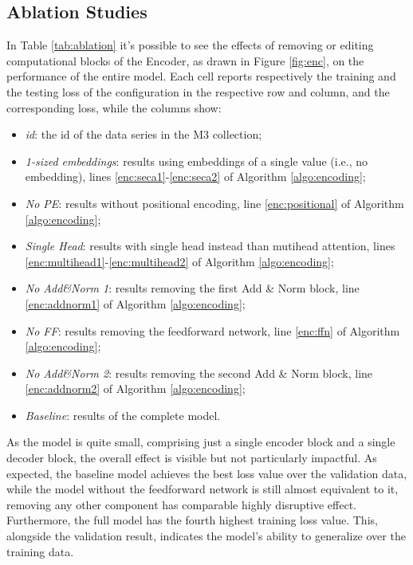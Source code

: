 \documentclass[algorithms,article,submit,pdftex,moreauthors]{Definitions/mdpi}
\begin{document}
{\color{blue}
\subsection{Ablation Studies}

In Table \ref{tab:ablation} it's possible to see the effects of removing or editing computational blocks of the Encoder, as drawn in Figure \ref{fig:enc}, on the performance of the entire model. Each cell reports respectively the training and the testing loss of the configuration in the respective row and column, and the corresponding loss, while the columns show:

\begin{itemize}
	\item {\it id}: the id of the data series in the M3 collection;
	\item {\it 1-sized embeddings}: results using embeddings of a single value (i.e., no embedding), lines \ref{enc:seca1}-\ref{enc:seca2} of Algorithm \ref{algo:encoding};
	\item {\it No PE}: results without positional encoding, line \ref{enc:positional} of Algorithm \ref{algo:encoding};
	\item {\it Single Head}: results with single head instead than mutihead attention, lines \ref{enc:multihead1}-\ref{enc:multihead2} of Algorithm \ref{algo:encoding}; 
	\item {\it No Add\&Norm 1}: results removing the first Add \& Norm block, line \ref{enc:addnorm1} of Algorithm \ref{algo:encoding};
	\item {\it No FF}: results removing the feedforward network, line \ref{enc:ffn} of Algorithm \ref{algo:encoding};
	\item {\it No Add\&Norm 2}: results removing the second Add \& Norm block, line \ref{enc:addnorm2} of Algorithm \ref{algo:encoding};
	\item {\it Baseline}: results of the complete model.
\end{itemize}

As the model is quite small, comprising just a single encoder block and a single decoder block, the overall effect is visible but not particularly impactful. As expected, the baseline model achieves the best loss value over the validation data, while the model without the feedforward network is still almost equivalent to it, removing any other component has comparable highly disruptive effect. Furthermore, the full model has the fourth highest training loss value. This, alongside the validation result, indicates the model's ability to generalize over the training data.

}
\end{document}
